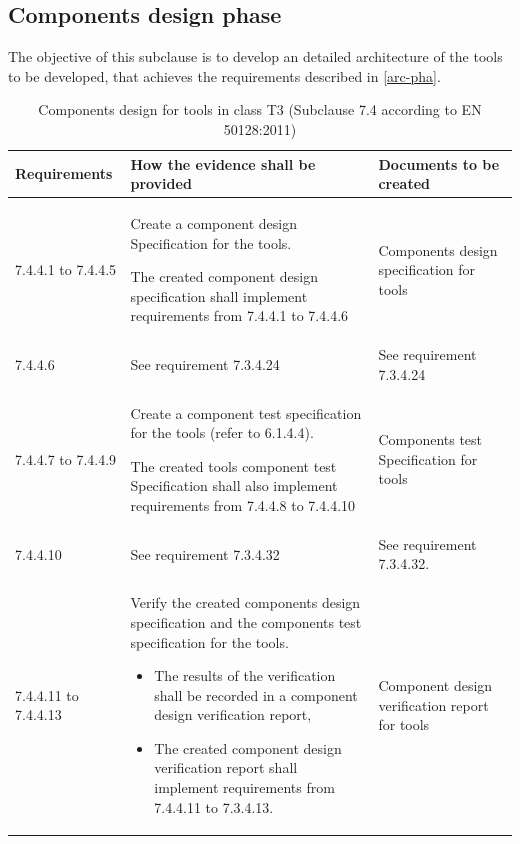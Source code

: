 \documentclass{template/openetcs_report}
\begin{document}
\subsection{Components design phase}
\begin{flushleft}
The objective of this subclause is to develop an detailed architecture of the tools to be developed, that achieves the requirements described in \ref{arc-pha}.
\end{flushleft}
{\footnotesize\sffamily\centering
\begin{longtable}{|p{2cm}|p{9cm}|p{3cm}|}
\caption{Components design for tools in class T3 (Subclause 7.4 according to EN 50128:2011)}\\
\hline
\bfseries Requirements & \bfseries How the evidence shall be provided & \bfseries Documents to be created\\
\hline
\hline
\endhead
\hline
\endfoot

7.4.4.1 to 7.4.4.5 & Create a component design Specification for the tools. 

The created component design specification shall implement requirements from 7.4.4.1 to 7.4.4.6
& Components design specification for tools\\ 
\hline
7.4.4.6 & See requirement 7.3.4.24 & See requirement 7.3.4.24\\ 
\hline
7.4.4.7 to 7.4.4.9 & Create a component test specification for the tools (refer to 6.1.4.4).

The created tools component test Specification shall also implement requirements from 7.4.4.8 to 7.4.4.10
& Components test Specification for tools\\ 
\hline
7.4.4.10 & See requirement 7.3.4.32 & See requirement 7.3.4.32.\\ 
\hline
7.4.4.11 to 7.4.4.13 & Verify the created components design specification and the components test specification for the tools.
\begin{itemize}\itemsep=0pt
  \item The results of the verification shall be recorded in a component design verification report,
  \item The created component design verification report shall implement requirements from 7.4.4.11 to 7.3.4.13. 
\end{itemize}
& Component design verification report for tools\\ 
\hline
\end{longtable}}
\end{document}
